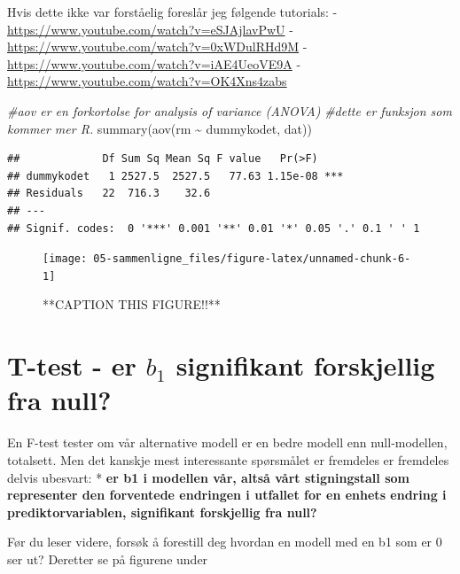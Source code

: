 \documentclass[
]{book}
\newenvironment{Shaded}{\begin{snugshade}}{\end{snugshade}}
\newcommand{\CommentTok}[1]{\textcolor[rgb]{0.56,0.35,0.01}{\textit{#1}}}
\newcommand{\FunctionTok}[1]{\textcolor[rgb]{0.00,0.00,0.00}{#1}}
\newcommand{\NormalTok}[1]{#1}
\newcommand{\SpecialCharTok}[1]{\textcolor[rgb]{0.00,0.00,0.00}{#1}}
\begin{document}
Hvis dette ikke var forståelig foreslår jeg følgende tutorials:
- \url{https://www.youtube.com/watch?v=eSJAjlavPwU}
- \url{https://www.youtube.com/watch?v=0xWDulRHd9M}
- \url{https://www.youtube.com/watch?v=iAE4UeoVE9A}
- \url{https://www.youtube.com/watch?v=OK4Xns4zabs}

\begin{Shaded}
\begin{Highlighting}[]
\CommentTok{\#aov er en forkortolse for analysis of variance (ANOVA)}
\CommentTok{\#dette er funksjon som kommer mer R.}
\FunctionTok{summary}\NormalTok{(}\FunctionTok{aov}\NormalTok{(rm }\SpecialCharTok{\textasciitilde{}}\NormalTok{ dummykodet, dat))}
\end{Highlighting}
\end{Shaded}

\begin{verbatim}
##             Df Sum Sq Mean Sq F value   Pr(>F)    
## dummykodet   1 2527.5  2527.5   77.63 1.15e-08 ***
## Residuals   22  716.3    32.6                     
## ---
## Signif. codes:  0 '***' 0.001 '**' 0.01 '*' 0.05 '.' 0.1 ' ' 1
\end{verbatim}

\begin{figure}

{\centering \texttt{[image: 05-sammenligne\_files/figure-latex/unnamed-chunk-6-1]} 

}

\caption{**CAPTION THIS FIGURE!!**}\label{fig:unnamed-chunk-6}
\end{figure}

\hypertarget{t-test---er-b_1-signifikant-forskjellig-fra-null}{%
\chapter{\texorpdfstring{T-test - er \(b_1\) signifikant forskjellig fra null?}{T-test - er b\_1 signifikant forskjellig fra null?}}\label{t-test---er-b_1-signifikant-forskjellig-fra-null}}

En F-test tester om vår alternative modell er en bedre modell enn null-modellen, totalsett. Men det kanskje mest interessante spørsmålet er fremdeles er fremdeles delvis ubesvart:
* \textbf{er b1 i modellen vår, altså vårt stigningstall som representer den forventede endringen i utfallet for en enhets endring i prediktorvariablen, signifikant forskjellig fra null?}

Før du leser videre, forsøk å forestill deg hvordan en modell med en b1 som er 0 ser ut? Deretter se på figurene under
\end{document}
